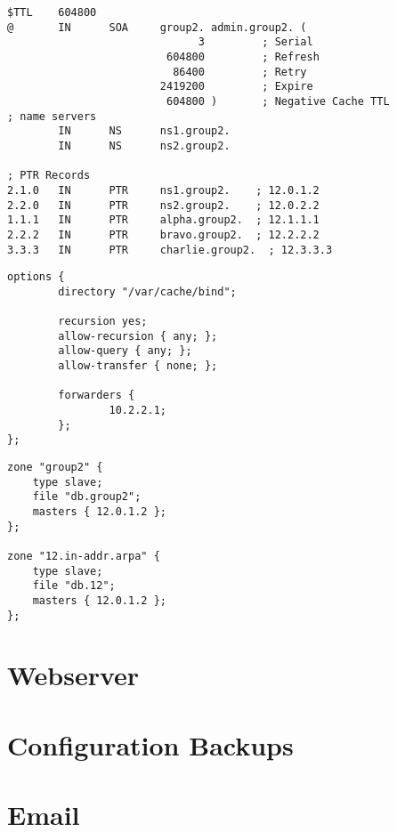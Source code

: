 \documentclass{report}
\begin{document}
\begin{lstlisting}[caption={Master \texttt{db.12}, for reverse DNS},label=
{listing:master-dns-db-12}]
$TTL    604800
@       IN      SOA     group2. admin.group2. (
                              3         ; Serial
                         604800         ; Refresh
                          86400         ; Retry
                        2419200         ; Expire
                         604800 )       ; Negative Cache TTL
; name servers
        IN      NS      ns1.group2.
        IN      NS      ns2.group2.

; PTR Records
2.1.0   IN      PTR     ns1.group2.    ; 12.0.1.2
2.2.0   IN      PTR     ns2.group2.    ; 12.0.2.2
1.1.1   IN      PTR     alpha.group2.  ; 12.1.1.1
2.2.2   IN      PTR     bravo.group2.  ; 12.2.2.2
3.3.3   IN      PTR     charlie.group2.  ; 12.3.3.3
\end{lstlisting}
\begin{lstlisting}[caption={Slave \texttt{named.conf.options}},label=
{listing:slave-dns-named-conf-options}]
options {
        directory "/var/cache/bind";

        recursion yes;
        allow-recursion { any; };
        allow-query { any; };
        allow-transfer { none; };

        forwarders {
                10.2.2.1;
        };
};
\end{lstlisting}
\begin{lstlisting}[caption={Slave \texttt{named.conf.local}},label=
{listing:slave-named-conf-local}]
zone "group2" {
    type slave;
    file "db.group2";
    masters { 12.0.1.2 };
};

zone "12.in-addr.arpa" {
    type slave;
    file "db.12";
    masters { 12.0.1.2 };
};
\end{lstlisting}

\section{Webserver}
\section{Configuration Backups}
\section{Email}
\end{document}

